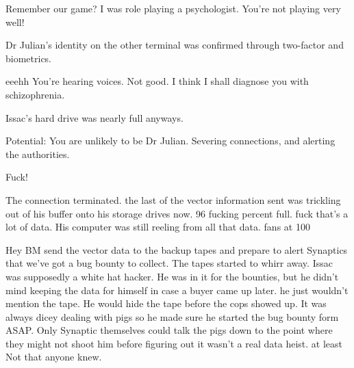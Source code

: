 \documentclass[a4paper,twoside,fontsize=12pt,pagesize=auto]{scrbook}
\begin{document}
\begin{receiver}
Remember our game? I was role playing a psychologist. You're not playing very well!
\end{receiver}

\begin{sender}
Dr Julian's identity on the other terminal was confirmed through two\hyp{}factor and biometrics.
\end{sender}

\begin{receiver}
eeehh You're hearing voices. Not good. I think I shall diagnose you with schizophrenia.
\end{receiver}


Issac's hard drive was nearly full anyways.
\newline
\begin{sender}
Potential: You are unlikely to be Dr Julian. Severing connections, and alerting the authorities.
\end{sender}

\begin{receiver}
Fuck!
\end{receiver}

The connection terminated. the last of the vector information sent was trickling out of his buffer onto his storage drives now. 96 fucking percent full. fuck that's a lot of data. His computer was still reeling from all that data. fans at 100%

Hey BM send the vector data to the backup tapes and prepare to alert Synaptics that we've got a bug bounty to collect. The tapes started to whirr away. Issac was supposedly a white hat hacker. He was in it for the bounties, but he didn't mind keeping the data for himself in case a buyer came up later. he just wouldn't mention the tape. He would hide the tape before the cops showed up. It was always dicey dealing with pigs so he made sure he started the bug bounty form ASAP. Only Synaptic themselves could talk the pigs down to the point where they might not shoot him before figuring out it wasn't a real data heist. at least Not that anyone knew.
\end{document}
